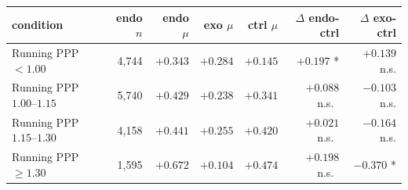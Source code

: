 \documentclass[twoside,11pt]{article}
\begin{document}
\begin{tabular}{lrrrrrr}
		\toprule
		condition & endo $n$ & endo $\mu$ & exo $\mu$ & ctrl $\mu$ & $\Delta$ endo-ctrl & $\Delta$ exo-ctrl \\
		\midrule
		Running PPP $< 1.00$       & 4{,}744 & $+0.343$ & $+0.284$ & $+0.145$ & $+0.197$ *    & $+0.139$ n.s. \\
		Running PPP $1.00$--$1.15$ & 5{,}740 & $+0.429$ & $+0.238$ & $+0.341$ & $+0.088$ n.s.\ & $-0.103$ n.s. \\
		Running PPP $1.15$--$1.30$ & 4{,}158 & $+0.441$ & $+0.255$ & $+0.420$ & $+0.021$ n.s.\ & $-0.164$ n.s. \\
		Running PPP $\geq 1.30$    & 1{,}595 & $+0.672$ & $+0.104$ & $+0.474$ & $+0.198$ n.s.\ & $-0.370$ *    \\
		\bottomrule
\end{tabular}
\end{document}

